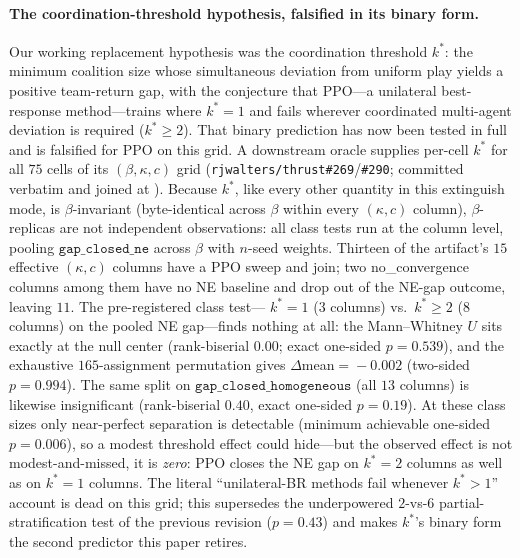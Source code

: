 \documentclass{anvil-paper}
\begin{document}
\paragraph{The coordination-threshold hypothesis, falsified in its
binary form.}
Our working replacement hypothesis was the coordination threshold
$k^{*}$: the minimum coalition size whose simultaneous deviation from
uniform play yields a positive team-return gap, with the conjecture
that PPO---a unilateral best-response method---trains where
$k^{*}{=}1$ and fails wherever coordinated multi-agent deviation is
required ($k^{*}{\geq}2$). That binary prediction has now been tested
in full and is falsified for PPO on this grid. A downstream oracle
supplies per-cell $k^{*}$ for all $75$ cells of its
$(\beta,\kappa,c)$ grid (\texttt{rjwalters/thrust\#269}/\texttt{\#290};
committed verbatim and joined at
).
Because $k^{*}$, like every other quantity in this extinguish mode, is
$\beta$-invariant (byte-identical across $\beta$ within every
$(\kappa,c)$ column), $\beta$-replicas are not independent
observations: all class tests run at the column level, pooling
$\texttt{gap\_closed\_ne}$ across $\beta$ with $n$-seed weights.
Thirteen of the artifact's $15$ effective $(\kappa,c)$ columns have a
PPO sweep and join; two \textsf{no\_convergence} columns among them
have no NE baseline and drop out of the NE-gap outcome, leaving $11$.
The pre-registered class test---%
$k^{*}{=}1$ ($3$ columns) vs.\ $k^{*}{\geq}2$ ($8$ columns) on the
pooled NE gap---finds nothing at all: the Mann--Whitney $U$ sits
exactly at the null center (rank-biserial $0.00$; exact one-sided
$p{=}0.539$), and the exhaustive $165$-assignment permutation gives
$\Delta$mean${}={}-0.002$ (two-sided $p{=}0.994$). The same split on
$\texttt{gap\_closed\_homogeneous}$ (all $13$ columns) is likewise
insignificant (rank-biserial $0.40$, exact one-sided $p{=}0.19$). At
these class sizes only near-perfect separation is detectable (minimum
achievable one-sided $p{=}0.006$), so a modest threshold effect could
hide---but the observed effect is not modest-and-missed, it is
\emph{zero}: PPO closes the NE gap on $k^{*}{=}2$ columns as well as
on $k^{*}{=}1$ columns. The literal ``unilateral-BR methods fail
whenever $k^{*}{>}1$'' account is dead on this grid; this supersedes
the underpowered $2$-vs-$6$ partial-stratification test of the
previous revision ($p{=}0.43$) and makes $k^{*}$'s binary form the
second predictor this paper retires.
\end{document}
